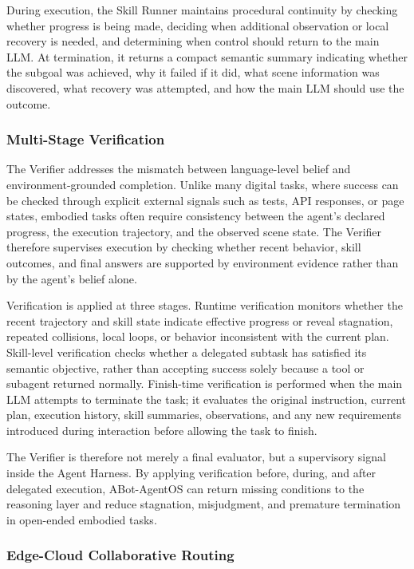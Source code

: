During execution, the Skill Runner maintains procedural continuity by
checking whether progress is being made, deciding when additional
observation or local recovery is needed, and determining when control
should return to the main LLM. At termination, it returns a compact
semantic summary indicating whether the subgoal was achieved, why it
failed if it did, what scene information was discovered, what recovery
was attempted, and how the main LLM should use the outcome.

\subsubsection{Multi-Stage Verification}
The Verifier addresses the mismatch between language-level belief and
environment-grounded completion. Unlike many digital tasks, where
success can be checked through explicit external signals such as tests,
API responses, or page states, embodied tasks often require consistency
between the agent's declared progress, the execution trajectory, and the
observed scene state. The Verifier therefore supervises execution by
checking whether recent behavior, skill outcomes, and final answers are
supported by environment evidence rather than by the agent's belief
alone.

Verification is applied at three stages. Runtime verification monitors
whether the recent trajectory and skill state indicate effective
progress or reveal stagnation, repeated collisions, local loops, or
behavior inconsistent with the current plan. Skill-level verification
checks whether a delegated subtask has satisfied its semantic objective,
rather than accepting success solely because a tool or subagent returned
normally. Finish-time verification is performed when the main LLM
attempts to terminate the task; it evaluates the original instruction,
current plan, execution history, skill summaries, observations, and any
new requirements introduced during interaction before allowing the task
to finish.

The Verifier is therefore not merely a final evaluator, but a
supervisory signal inside the Agent Harness. By applying verification
before, during, and after delegated execution, ABot-AgentOS can return
missing conditions to the reasoning layer and reduce stagnation,
misjudgment, and premature termination in open-ended embodied tasks.

\subsubsection{Edge-Cloud Collaborative Routing}

